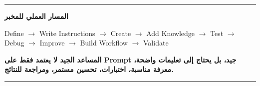 \documentclass[a4paper]{article}
\begin{document}
\begin{center}

\rule{0.9\textwidth}{0.5pt}

\vspace{0.2cm}

{\khatt\textbf{
المسار العملي للمخبر
}}

\vspace{0.2cm}

\textenglish{
Define
$\rightarrow$
Write Instructions
$\rightarrow$
Create
$\rightarrow$
Add Knowledge
$\rightarrow$
Test
$\rightarrow$
Debug
$\rightarrow$
Improve
$\rightarrow$
Build Workflow
$\rightarrow$
Validate
}

\vspace{0.2cm}

{\khatt\textbf{
المساعد الجيد لا يعتمد فقط على Prompt جيد،
بل يحتاج إلى تعليمات واضحة، معرفة مناسبة،
اختبارات، تحسين مستمر، ومراجعة للنتائج.
}}

\vspace{0.2cm}

\rule{0.9\textwidth}{0.5pt}

\end{center}
\end{document}
